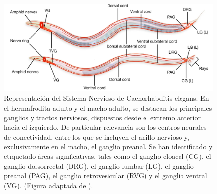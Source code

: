  \begin{figure}[h!]
	\centering\includegraphics[width=\imsizeL]{conectoma_a.png}
	\caption[Representación del Sistema Nervioso de Caenorhabditis elegans.]{ Representación del Sistema Nervioso de Caenorhabditis elegans. En el hermafrodita adulto y el macho adulto, se destacan los principales ganglios y tractos nerviosos, dispuestos desde el extremo anterior hacia el izquierdo. De particular relevancia son los centros neurales de conectividad, entre los que se incluyen el anillo nervioso y, exclusivamente en el macho, el ganglio preanal. Se han identificado y etiquetado áreas significativas, tales como el ganglio cloacal (CG), el ganglio dorsorrectal (DRG), el ganglio lumbar (LG), el ganglio preanal (PAG), el ganglio retrovesicular (RVG) y el ganglio ventral (VG).   (Figura adaptada de \protect\cite{cook_whole-animal_2019}).}\label{fig:conectoma_a}
\end{figure}


